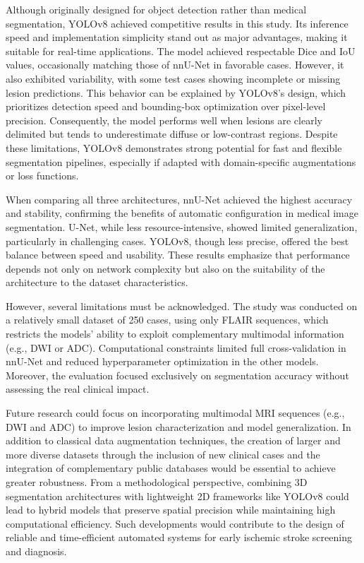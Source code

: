 \documentclass[12pt]{article}
\begin{document}
Although originally designed for object detection rather than medical segmentation, YOLOv8 achieved competitive results in this study. Its inference speed and implementation simplicity stand out as major advantages, making it suitable for real-time applications. The model achieved respectable Dice and IoU values, occasionally matching those of nnU-Net in favorable cases. However, it also exhibited variability, with some test cases showing incomplete or missing lesion predictions.
%
This behavior can be explained by YOLOv8’s design, which prioritizes detection speed and bounding-box optimization over pixel-level precision. Consequently, the model performs well when lesions are clearly delimited but tends to underestimate diffuse or low-contrast regions. Despite these limitations, YOLOv8 demonstrates strong potential for fast and flexible segmentation pipelines, especially if adapted with domain-specific augmentations or loss functions.

When comparing all three architectures, nnU-Net achieved the highest accuracy and stability, confirming the benefits of automatic configuration in medical image segmentation. U-Net, while less resource-intensive, showed limited generalization, particularly in challenging cases. YOLOv8, though less precise, offered the best balance between speed and usability. These results emphasize that performance depends not only on network complexity but also on the suitability of the architecture to the dataset characteristics. 

However, several limitations must be acknowledged. The study was conducted on a relatively small dataset of 250 cases, using only FLAIR sequences, which restricts the models’ ability to exploit complementary multimodal information (e.g., DWI or ADC). Computational constraints limited full cross-validation in nnU-Net and reduced hyperparameter optimization in the other models. Moreover, the evaluation focused exclusively on segmentation accuracy without assessing the real clinical impact.

Future research could focus on incorporating multimodal MRI sequences (e.g., DWI and ADC) to improve lesion characterization and model generalization. In addition to classical data augmentation techniques, the creation of larger and more diverse datasets through the inclusion of new clinical cases and the integration of complementary public databases would be essential to achieve greater robustness. From a methodological perspective, combining 3D segmentation architectures with lightweight 2D frameworks like YOLOv8 could lead to hybrid models that preserve spatial precision while maintaining high computational efficiency. Such developments would contribute to the design of reliable and time-efficient automated systems for early ischemic stroke screening and diagnosis.
\end{document}
